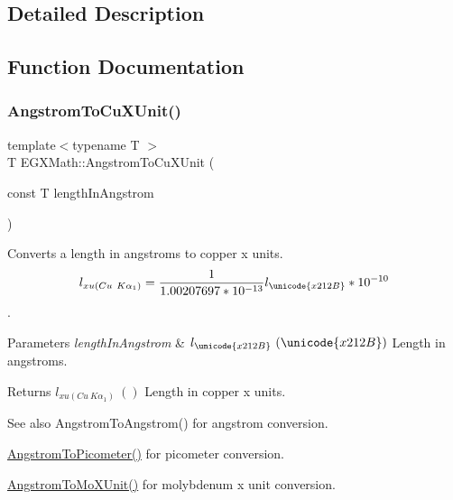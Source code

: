 \subsection{Detailed Description}


\subsection{Function Documentation}
\mbox{\label{group___e_g_x_math-_conversions-_length_conversions-_non-_s_i-_angstrom-_non-_s_i_gaf42d486942a8441d13065d8e13661ec6}} 
\subsubsection{\texorpdfstring{Angstrom\+To\+Cu\+X\+Unit()}{AngstromToCuXUnit()}}
{\footnotesize\ttfamily template$<$typename T $>$ \\
T E\+G\+X\+Math\+::\+Angstrom\+To\+Cu\+X\+Unit (\begin{DoxyParamCaption}\item[{const T}]{length\+In\+Angstrom }\end{DoxyParamCaption})}



Converts a length in angstroms to copper x units. \[ l_{xu(Cu\ K\alpha_1)}= \frac{1}{1.00207697*10^{-13}} l_{\unicode{x212B}} * 10^{-10}\]. 


\begin{DoxyParams}{Parameters}
{\em length\+In\+Angstrom} & $ l_{\unicode{x212B}}\ (\unicode{x212B})$ Length in angstroms. \\
\hline
\end{DoxyParams}
\begin{DoxyReturn}{Returns}
$ l_{xu(Cu\ K\alpha_1)}\ ()$ Length in copper x units. 
\end{DoxyReturn}
\begin{DoxySeeAlso}{See also}
Angstrom\+To\+Angstrom() for angstrom conversion. 

\mbox{\hyperlink{group___e_g_x_math-_conversions-_length_conversions-_non-_s_i-_angstrom-_s_i_ga59612970b9b51a1a900a76789ffaaf28}{Angstrom\+To\+Picometer()}} for picometer conversion. 

\mbox{\hyperlink{group___e_g_x_math-_conversions-_length_conversions-_non-_s_i-_angstrom-_non-_s_i_ga197c8294d73fcc3171cd05fc595816c4}{Angstrom\+To\+Mo\+X\+Unit()}} for molybdenum x unit conversion. 
\end{DoxySeeAlso}
\mbox{\label{group___e_g_x_math-_conversions-_length_conversions-_non-_s_i-_angstrom-_non-_s_i_ga651864e5c83caf88847a00a0b459eaa2}} 
